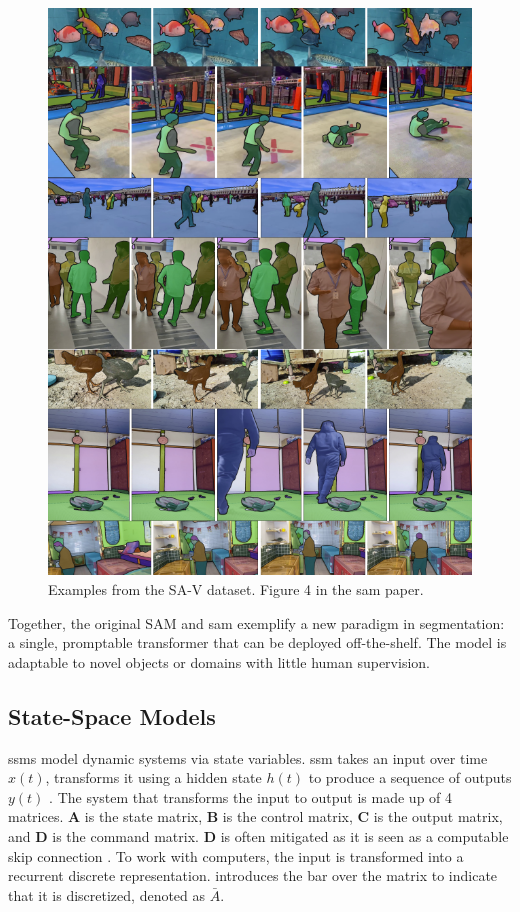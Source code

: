 \begin{figure}
    \centering
    \includegraphics[width=0.5\linewidth]{figures/sam_2.png}
    \caption{Examples from the SA-V dataset. Figure 4 in the \acrshort{sam} paper\cite{ravi_sam_nodate}.}
    \label{fig:sa-v}
\end{figure}

Together, the original SAM and \acrshort{sam} exemplify a new paradigm in segmentation: a single, promptable transformer that can be deployed off-the-shelf. The model is adaptable to novel objects or domains with little human supervision. 

\subsection{State-Space Models}
\label{ssec:state_space_models}

\acrfull{ssm}s model dynamic systems via state variables. \acrshort{ssm} takes an input over time \(x(t)\), transforms it using a hidden state \(h(t)\) to produce a sequence of outputs \(y(t)\) \cite{gu_mamba_2024}. The system that transforms the input to output is made up of 4 matrices. \textbf{A} is the state matrix, \textbf{B} is the control matrix, \textbf{C} is the output matrix, and \textbf{D} is the command matrix. \textbf{D} is often mitigated as it is seen as a computable skip connection \cite{gu_mamba_2024}. To work with computers, the input is transformed into a recurrent discrete representation. \textcite{gu_mamba_2024} introduces the bar over the matrix to indicate that it is discretized, denoted as $ \bar{A} $.



